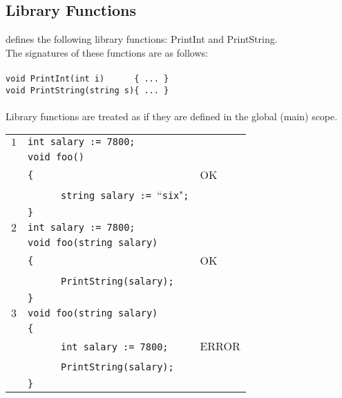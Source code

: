 \documentclass{article}
\begin{document}
\subsection{Library Functions}
\label{subsection_Library_Functions}
\plname defines the following library functions: PrintInt and PrintString.\\
The signatures of these functions are as follows:\\ \\
\verb"void PrintInt(int i)      { ... }"\\ 
\verb"void PrintString(string s){ ... }"\\ 
\\
Library functions are treated as if they are defined in the global (main) scope.
\begin{table}[h]
\centering
\begin{tabular}{|l|l|l|}
\hline
 $1$ & \verb"int salary := 7800;"                            &    \\
     & \verb"void foo()"                                     &    \\
     & \verb"{"                                              & OK \\
     & ~ ~ ~ ~\verb"string salary := "``\verb"six""\verb";"  &    \\
     & \verb"}"                                              &    \\
\hline
 $2$ & \verb"int salary := 7800;"         &    \\
     & \verb"void foo(string salary)"     &    \\
     & \verb"{"                           & OK \\
     & ~ ~ ~ ~\verb"PrintString(salary);" &    \\
     & \verb"}"                           &    \\
\hline
 $3$ & \verb"void foo(string salary)"     &       \\
     & \verb"{"                           &       \\
     & ~ ~ ~ ~\verb"int salary := 7800;"  & ERROR \\
     & ~ ~ ~ ~\verb"PrintString(salary);" &       \\
     & \verb"}"                           &       \\

\end{tabular}
\end{table}
\end{document}
